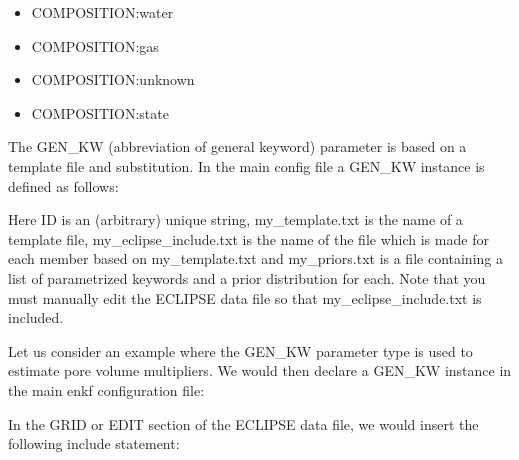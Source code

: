 \documentclass[a4paper,10pt,english]{sphinxmanual}
\begin{document}
\begin{sphinxShadowBox}
\begin{itemize}
\item {} 
COMPOSITION:water

\item {} 
COMPOSITION:gas

\item {} 
COMPOSITION:unknown

\item {} 
COMPOSITION:state

\end{itemize}
\end{sphinxShadowBox}
\label{\detokenize{keywords/index:gen-kw}}
\begin{sphinxShadowBox}

The GEN\_KW (abbreviation of general keyword) parameter is based on a template
file and substitution. In the main config file a GEN\_KW instance is defined as
follows:

%
\begin{sphinxVerbatim}[commandchars=\\\{\}]
        
\end{sphinxVerbatim}

Here ID is an (arbitrary) unique string, my\_template.txt is the name of a
template file, my\_eclipse\_include.txt is the name of the file which is made
for each member based on my\_template.txt and my\_priors.txt is a file
containing a list of parametrized keywords and a prior distribution for each.
Note that you must manually edit the ECLIPSE data file so that
my\_eclipse\_include.txt is included.

Let us consider an example where the GEN\_KW parameter type is used to estimate
pore volume multipliers. We would then declare a GEN\_KW instance in the main
enkf configuration file:

%
\begin{sphinxVerbatim}[commandchars=\\\{\}]
    
\end{sphinxVerbatim}

In the GRID or EDIT section of the ECLIPSE data file, we would insert the
following include statement:


\end{sphinxShadowBox}
\end{document}
